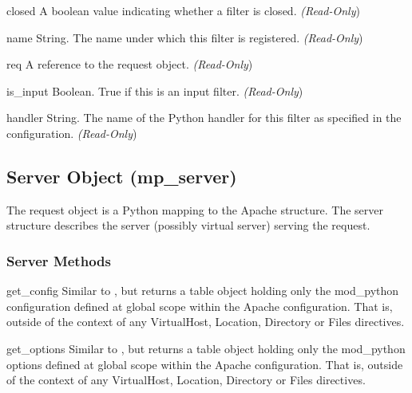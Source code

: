 \begin{memberdesc}[filter]{closed}
  A boolean value indicating whether a filter is closed.
  \emph{(Read-Only})
\end{memberdesc}

\begin{memberdesc}[filter]{name}
  String. The name under which this filter is registered.
  \emph{(Read-Only})
\end{memberdesc}

\begin{memberdesc}[filter]{req}
  A reference to the request object.
  \emph{(Read-Only})
\end{memberdesc}

\begin{memberdesc}[filter]{is_input}
  Boolean. True if this is an input filter.
  \emph{(Read-Only})
\end{memberdesc}

\begin{memberdesc}[filter]{handler}
  String. The name of the Python handler for this filter as specified in
  the configuration. 
  \emph{(Read-Only})
\end{memberdesc}

\subsection{Server Object (mp_server)\label{pyapi-mpserver}}

The request object is a Python mapping to the Apache 
structure. The server structure describes the server (possibly virtual
server) serving the request.

\subsubsection{Server Methods\label{pyapi-mpsrv-meth}}

\begin{methoddesc}[server]{get_config}{}
  Similar to , but returns a table object holding
  only the mod_python configuration defined at global scope within the
  Apache configuration. That is, outside of the context of any VirtualHost,
  Location, Directory or Files directives.
\end{methoddesc}

\begin{methoddesc}[server]{get_options}{}
  Similar to , but returns a table object holding
  only the mod_python options defined at global scope within the Apache
  configuration. That is, outside of the context of any VirtualHost, Location,
  Directory or Files directives.
\end{methoddesc}

